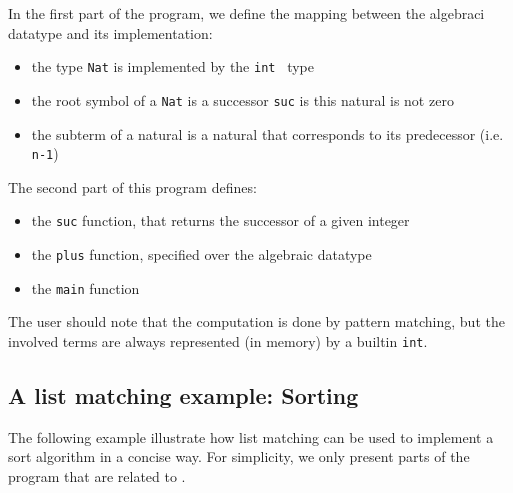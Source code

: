 \noindent
In the first part of the program, we define the mapping between the
algebraci datatype and its implementation:
\begin{itemize}
\item the type \texttt{Nat} is implemented by the \texttt{int} \C\
  type 
\item the root symbol of a \texttt{Nat} is a successor \texttt{suc} is
  this natural is not zero
\item the subterm of a natural is a natural that corresponds
  to its predecessor (i.e. \texttt{n-1})
\end{itemize}



\noindent
The second part of this program defines:
\begin{itemize}
\item the \texttt{suc} function, that returns the successor of a given integer
\item the \texttt{plus} function, specified over the algebraic datatype
\item the \texttt{main} function
\end{itemize}
The user should note that the computation is done by pattern matching,
but the involved terms are always represented (in memory) by a builtin
\texttt{int}.



\subsection{A list matching example: Sorting}
The following example illustrate how list matching can be used to
implement a sort algorithm in a concise way.
For simplicity, we only present parts of the program that are related
to \TOM.

